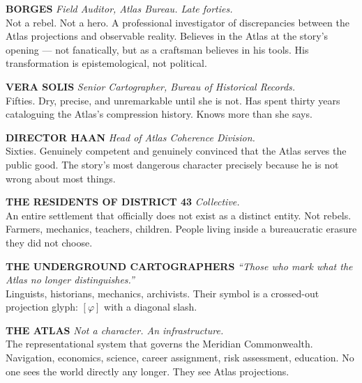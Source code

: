 \documentclass[11pt, letterpaper]{article}
\begin{document}
\textbf{BORGES} \hfill \textit{Field Auditor, Atlas Bureau. Late forties.}\\
Not a rebel. Not a hero. A professional investigator of discrepancies between
the Atlas projections and observable reality. Believes in the Atlas at the
story's opening — not fanatically, but as a craftsman believes in his tools.
His transformation is epistemological, not political.

\vspace{0.8em}

\textbf{VERA SOLIS} \hfill \textit{Senior Cartographer, Bureau of Historical Records.}\\
Fifties. Dry, precise, and unremarkable until she is not. Has spent thirty
years cataloguing the Atlas's compression history. Knows more than she says.

\vspace{0.8em}

\textbf{DIRECTOR HAAN} \hfill \textit{Head of Atlas Coherence Division.}\\
Sixties. Genuinely competent and genuinely convinced that the Atlas serves the
public good. The story's most dangerous character precisely because he is not
wrong about most things.

\vspace{0.8em}

\textbf{THE RESIDENTS OF DISTRICT 43} \hfill \textit{Collective.}\\
An entire settlement that officially does not exist as a distinct entity.
Not rebels. Farmers, mechanics, teachers, children. People living inside a
bureaucratic erasure they did not choose.

\vspace{0.8em}

\textbf{THE UNDERGROUND CARTOGRAPHERS} \hfill
\textit{``Those who mark what the Atlas no longer distinguishes.''}\\
Linguists, historians, mechanics, archivists. Their symbol is a crossed-out
projection glyph: $[\varphi]$ with a diagonal slash.

\vspace{0.8em}

\textbf{THE ATLAS} \hfill \textit{Not a character. An infrastructure.}\\
The representational system that governs the Meridian Commonwealth. Navigation,
economics, science, career assignment, risk assessment, education. No one sees
the world directly any longer. They see Atlas projections.
\end{document}

